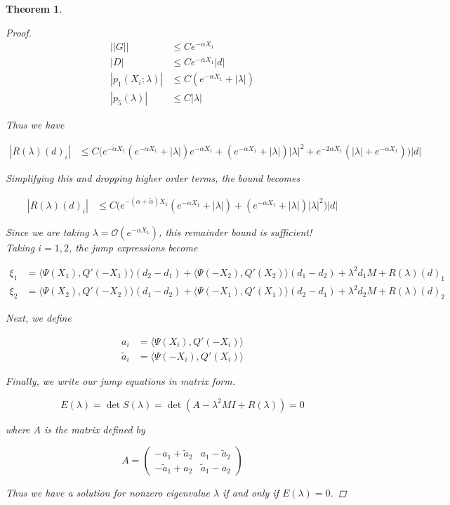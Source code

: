 \documentclass[12pt]{article}
\newtheorem{theorem}{Theorem}
\begin{document}
\begin{theorem}
\begin{proof}
\begin{align*}
||G|| &\leq C e^{-\alpha X_1} \\
|D| &\leq C e^{-\alpha X_1} |d| \\
|p_1(X_i; \lambda)| &\leq C (e^{-\alpha X_1} + |\lambda|) \\
|p_5(\lambda)| &\leq C|\lambda|
\end{align*}

Thus we have

\begin{align*}
|R(\lambda)(d)_i| &\leq C \Big( e^{-\tilde{\alpha}X_1}( e^{-\alpha X_1} + |\lambda|  ) e^{-\alpha X_1}
+ (e^{-\alpha X_1} + |\lambda| ) |\lambda|^2 
+ e^{-2 \alpha X_1} (|\lambda| +  e^{-\alpha X_1} ) \Big) |d|
\end{align*}

Simplifying this and dropping higher order terms, the bound becomes

\begin{align*}
|R(\lambda)(d)_i| &\leq C \Big( e^{-(\alpha + \tilde{\alpha})X_1}( e^{-\alpha X_1} + |\lambda|  )  
+ (e^{-\alpha X_1} + |\lambda| ) |\lambda|^2 \Big) |d|
\end{align*}

Since we are taking $\lambda = \mathcal{O}(e^{-\alpha X_1})$, this remainder bound is sufficient!\\

Taking $i = 1, 2$, the jump expressions become

\begin{align*}
\xi_1 &= \langle \Psi(X_1), Q'(-X_1) \rangle (d_2 - d_1 ) + \langle \Psi(-X_2), Q'(X_2) \rangle (d_1 - d_2 ) + \lambda^2 d_1 M + R(\lambda)(d)_1 \\
\xi_2 &= \langle \Psi(X_2), Q'(-X_2) \rangle (d_1 - d_2 ) + \langle \Psi(-X_1), Q'(X_1) \rangle (d_2 - d_1 ) + \lambda^2 d_2 M + R(\lambda)(d)_2
\end{align*}

Next, we define

\begin{align*}
a_i &= \langle \Psi (X_i), Q'(-X_i) \rangle \\
\tilde{a}_i &= \langle \Psi(-X_i), Q'(X_i) \rangle
\end{align*}

Finally, we write our jump equations in matrix form.

\[
E(\lambda) = \det S(\lambda) = \det(A - \lambda^2 MI + R(\lambda) ) = 0
\]

where $A$ is the matrix defined by

\[
A = 
\begin{pmatrix}
-a_1 + \tilde{a}_2 & a_1 - \tilde{a}_2 \\
-\tilde{a}_1 + a_2 & \tilde{a}_1 - a_2 
\end{pmatrix}
\]

Thus we have a solution for nonzero eigenvalue $\lambda$ if and only if $E(\lambda) = 0$.

\end{proof}
\end{theorem}
\end{document}
